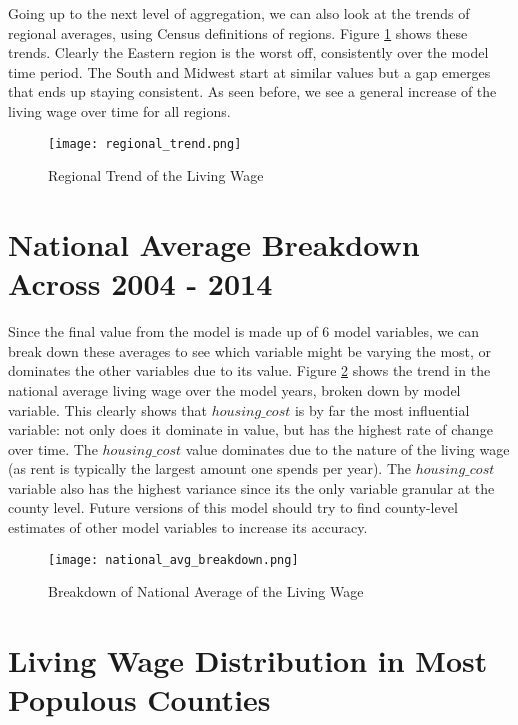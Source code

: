 Going up to the next level of aggregation, we can also look at the trends of regional averages, using Census definitions of regions. Figure \ref{f:ch4_regional_trend} shows these trends. Clearly the Eastern region is the worst off, consistently over the model time period. The South and Midwest start at similar values but a gap emerges that ends up staying consistent. As seen before, we see a general increase of the living wage over time for all regions.

\begin{figure}[H]
    \centering
        \texttt{[image: regional\_trend.png]}
        \caption{Regional Trend of the Living Wage}
    \label{f:ch4_regional_trend}
\end{figure}




\section{National Average Breakdown Across 2004 - 2014}

Since the final value from the model is made up of 6 model variables, we can break down these averages to see which variable might be varying the most, or dominates the other variables due to its value. Figure \ref{f:ch4_national_avg_breakdown} shows the trend in the national average living wage over the model years, broken down by model variable. This clearly shows that $housing\_cost$ is by far the most influential variable: not only does it dominate in value, but has the highest rate of change over time. The $housing\_cost$ value dominates due to the nature of the living wage (as rent is typically the largest amount one spends per year). The $housing\_cost$ variable also has the highest variance since its the only variable granular at the county level. Future versions of this model should try to find county-level estimates of other model variables to increase its accuracy.

\begin{figure}[H]
    \centering
        \texttt{[image: national\_avg\_breakdown.png]}
        \caption{Breakdown of National Average of the Living Wage}
    \label{f:ch4_national_avg_breakdown}
\end{figure}




\section{Living Wage Distribution in Most Populous Counties}

